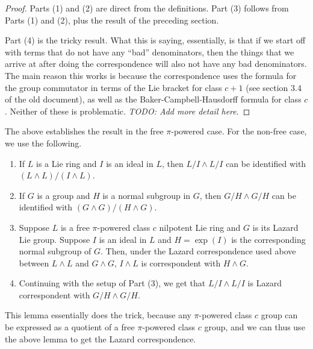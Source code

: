 \documentclass[10pt]{amsart}
\begin{document}
\begin{proof}
  Parts (1) and (2) are direct from the definitions. Part (3) follows
  from Parts (1) and (2), plus the result of the preceding section. 

  Part (4) is the tricky result. What this is saying, essentially, is
  that if we start off with terms that do not have any ``bad''
  denominators, then the things that we arrive at after doing the
  correspondence will also not have any bad denominators. The main
  reason this works is because the correspondence uses the formula for
  the group commutator in terms of the Lie bracket for class $c + 1$
  (see section 3.4 of the old document), as well as the
  Baker-Campbell-Hausdorff formula for class $c$. Neither of these is
  problematic. {\em TODO: Add more detail here}.
\end{proof}

The above establishes the result in the free $\pi$-powered case. For
the non-free case, we use the following.

\begin{lemma}
  \begin{enumerate}
  \item If $L$ is a Lie ring and $I$ is an ideal in $L$, then $L/I
    \wedge L/I$ can be identified with $(L \wedge L)/(I \wedge L)$.
  \item If $G$ is a group and $H$ is a normal subgroup in $G$, then
    $G/H \wedge G/H$ can be identified with $(G \wedge G)/(H \wedge G)$.
  \item Suppose $L$ is a free $\pi$-powered class $c$ nilpotent Lie
    ring and $G$ is its Lazard Lie group. Suppose $I$ is an ideal in
    $L$ and $H = \exp(I)$ is the corresponding normal subgroup of
    $G$. Then, under the Lazard correspondence used above between $L
    \wedge L$ and $G \wedge G$, $I \wedge L$ is correspondent with $H
    \wedge G$.
  \item Continuing with the setup of Part (3), we get that $L/I \wedge
    L/I$ is Lazard correspondent with $G/H \wedge G/H$.
  \end{enumerate}
\end{lemma}

This lemma essentially does the trick, because any $\pi$-powered class
$c$ group can be expressed as a quotient of a free $\pi$-powered class
$c$ group, and we can thus use the above lemma to get the Lazard
correspondence.
\end{document}
